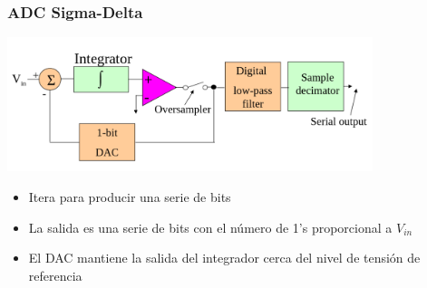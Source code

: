 \documentclass{beamer}
\begin{document}
\begin{frame}
\frametitle{ADC Sigma-Delta}
\begin{exampleblock}{}
  \begin{center}
\includegraphics[width=0.8\textwidth]{d3/sigma_delta_adc}
  \end{center}
\end{exampleblock}
\begin{exampleblock}{}
        \begin{itemize}
          \item Itera para producir una serie de bits
          \item La salida es una serie de bits con el número de 1's proporcional a $V_{in}$
          \item El DAC mantiene la salida del integrador cerca del nivel de
tensión de referencia
        \end{itemize}
\end{exampleblock}
\end{frame}
\end{document}
